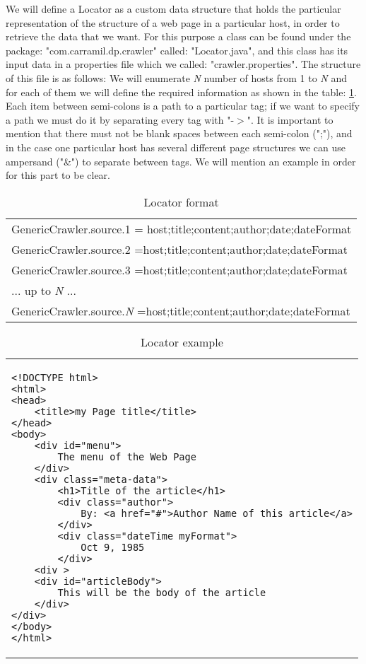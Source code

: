 We will define a Locator as a custom data structure that holds the particular representation of the structure of a web page in a particular host, in order to retrieve the data that we want. For this purpose a class can be found under the package: "com.carramil.dp.crawler" called: "Locator.java", and this class has its input data in a properties file which we called: "crawler.properties". The structure of this file is as follows: We will enumerate \textit{N} number of hosts from 1 to \textit{N} and for each of them we will define the required information as shown in the table: \ref{tab:locator}. Each item between semi-colons is a path to a particular tag; if we want to specify a path we must do it by separating every tag with "-$>$". It is important to mention that there must not be blank spaces between each semi-colon (";"), and in the case one particular host has several different page structures we can use ampersand ("\&") to separate between tags. We will mention an example in order for this part to be clear.

\begin{table}\centering
	\caption{Locator format}\label{tab:locator}
   	\begin{tabular}{p{11.5cm}}
   	\hline
GenericCrawler.source.1 = host;title;content;author;date;dateFormat\\
GenericCrawler.source.2 =host;title;content;author;date;dateFormat\\
GenericCrawler.source.3 =host;title;content;author;date;dateFormat\\
... up to \textit{N} ...\\
GenericCrawler.source.\textit{N} =host;title;content;author;date;dateFormat\\
    \hline
    \end{tabular}
\end{table}

\begin{table}\centering
	\caption{Locator example}\label{tab:locatorExample1}
   	\begin{tabular}{p{11.5cm}}
\lstset{language=HTML}
\begin{lstlisting}
<!DOCTYPE html>
<html>
<head>
    <title>my Page title</title>
</head>
<body>
	<div id="menu">
		The menu of the Web Page
	</div>
	<div class="meta-data">
		<h1>Title of the article</h1>
		<div class="author">
			By: <a href="#">Author Name of this article</a>
		</div>
		<div class="dateTime myFormat">
			Oct 9, 1985
		</div>
	<div >
	<div id="articleBody">
		This will be the body of the article
	</div>
</div> 
</body>
</html>
\end{lstlisting}
    \end{tabular}
\end{table}

